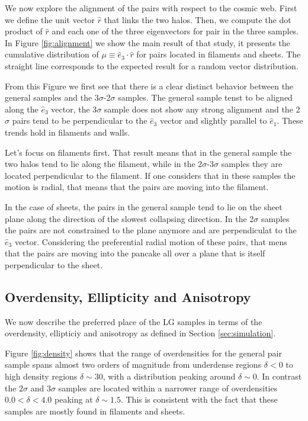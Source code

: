 \documentclass{emulateapj}
\begin{document}
We now explore the alignment of the pairs with respect to the cosmic
web. First we define the unit vector $\hat{r}$ that links the two
halos. Then, we compute the dot product of $\hat{r}$ and each one of
the three eigenvectors for pair in the three samples. In Figure
\ref{fig:alignment} we show the main result of that study, it
presents the cumulative distribution of
$\mu\equiv\hat{e}_3\cdot\hat{r}$ for pairs located in filaments and
sheets. The straight line corresponds to the expected result for a
random vector distribution. 


From this Figure we first see that there is a clear distinct behavior
between the general samples and the 3$\sigma$-2$\sigma$ samples. The
general sample tenst to be aligned along the $\hat{e}_3$ vector, the
3$\sigma$ sample does not show any strong alignment and the 2$\sigma$
pairs tend to be perpendicular to the $\hat{e}_3$ vector and slightly
parallel to $\hat{e}_1$. These trends hold in filaments and walls.

Let's focus on filaments first. That result means that in the general
sample the two halos tend to lie along the filament, while in the
2$\sigma$-3$\sigma$ samples they are located perpendicular to the
filament. If one considers that in these samples the motion is radial,
that means that the pairs are moving into the filament.

In the case of sheets, the pairs in the general sample tend to lie on
the sheet plane along the direction of the slowest collapsing
direction. In the 2$\sigma$ samples the pairs are not constrained to
the plane anymore and are perpendiculat to the $\hat{e}_3$
vector. Considering the preferential radial motion of these pairs,
that mens that the pairs are moving into the pancake all over a plane that
is itself perpendicular to the sheet. 


\subsection{Overdensity, Ellipticity and Anisotropy}


We now describe the preferred place of the LG samples in terms of the
overdensity, ellipticiy and anisotropy as defined in Section
\ref{sec:simulation}. 

Figure \ref{fig:density} shows that the range of overdensities for the
general pair sample spans almost two orders of magnitude from
underdense regions $\delta<0$ to high density regions $\delta\sim 30$,
with a distribution peaking around $\delta \sim 0$. In contrast the
$2\sigma$ and $3\sigma$ samples are located within a narrower range of
overdensities $0.0<\delta<4.0$ peaking at $\delta \sim 1.5$. This is
consistent with the fact that these samples are mostly found in
filaments and sheets.   
\end{document}
